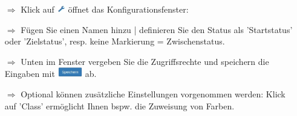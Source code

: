 \documentclass{article}
\begin{document}
\begin{multicols}{2}
\begin{tcolorbox}[colback=blue!5,colframe=blue!40!black,title=Workflows konfigurieren 1]
\begin{itemize}
\begin{centering}
\end{centering}
	
  \item[$\Longrightarrow$] Klick auf \includegraphics[height=10pt]{Icons/Schraubenschluessel.jpg} öffnet das Konfigurationsfenster:
  \item[$\Longrightarrow$] Fügen Sie einen Namen hinzu | definieren Sie den Status als 'Startstatus' oder 'Zielstatus', resp. keine Markierung = Zwischenstatus.
  \item[$\Longrightarrow$] Unten im Fenster vergeben Sie die Zugriffsrechte und speichern die Eingaben mit \includegraphics[height=12pt]{Icons/Speichern.png} ab.
	\item[$\Longrightarrow$] Optional können zusätzliche Einstellungen vorgenommen werden: Klick auf 'Class' ermöglicht Ihnen bspw. die Zuweisung von Farben.
\end{itemize}
\end{tcolorbox}

\end{multicols}

\vspace{\baselineskip}

\end{document}
